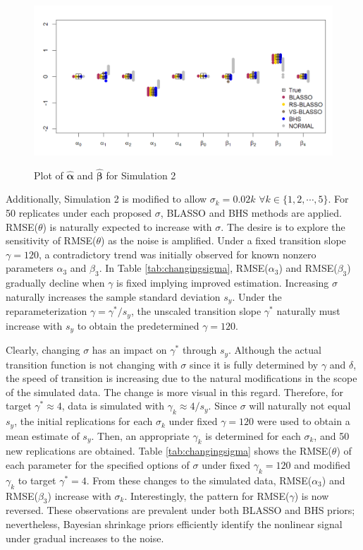 \begin{figure}[h]
	\centering
	      \caption{Plot of $\hat{\bm{\alpha}}$ and $\hat{\bm{\beta}}$ for Simulation 2}
      \includegraphics[scale=0.35]{blassovsbhs3}
      \label{fig:blvsbh3}
\end{figure}

Additionally, Simulation 2 is modified to allow $\sigma_k=0.02k$ $\forall k \in \{1,2,\cdots, 5\}$. For 50 replicates under each proposed $\sigma$, BLASSO and BHS methods are applied.  RMSE($\theta$) is naturally expected to increase with $\sigma$. The desire is to explore the sensitivity of RMSE($\theta$) as the noise is amplified. Under a fixed transition slope $\gamma=120$,  a contradictory trend was initially observed for known nonzero parameters $\alpha_3$ and $\beta_3$.  In Table \ref{tab:changingsigma}, RMSE($\alpha_3$) and RMSE($\beta_3$) gradually decline when $\gamma$ is fixed implying improved estimation. Increasing $\sigma$ naturally increases the sample standard deviation $s_{y}$. Under the reparameterization $\gamma=\gamma^*/s_y$, the unscaled transition slope $\gamma^*$ naturally must increase with $s_y$ to obtain the predetermined $\gamma=120$. 

Clearly, changing $\sigma$ has an impact on $\gamma^*$ through $s_y$. Although the actual transition function is not changing with $\sigma$ since it is fully determined by $\gamma$ and $\delta$, the speed of transition is increasing due to the natural modifications in the scope of the simulated data. The change is more visual in this regard. Therefore, for target $\gamma^*\approx 4$, data is simulated with $\gamma_k \approx 4/s_y$. Since $\sigma$ will naturally not equal $s_y$, the initial replications for each $\sigma_k$ under fixed $\gamma=120$ were used to obtain a mean estimate of $s_y$. Then, an appropriate $\gamma_k$ is determined for each $\sigma_k$, and 50 new replications are obtained. Table \ref{tab:changingsigma} shows the RMSE($\theta$) of each parameter for the specified options of $\sigma$ under fixed $\gamma_k=120$ and modified $\gamma_k$ to target $\gamma^*=4$. From these changes to the simulated data, RMSE($\alpha_3$) and RMSE($\beta_3$) increase with $\sigma_k$. Interestingly, the pattern for RMSE($\gamma$) is now reversed. These observations are  prevalent under both BLASSO and BHS priors; nevertheless, Bayesian shrinkage priors efficiently identify the nonlinear signal under gradual increases to the noise.




